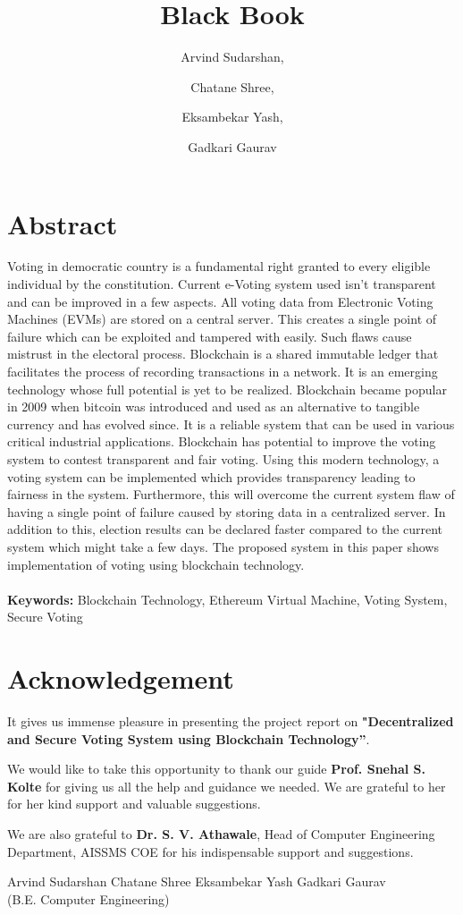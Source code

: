 \documentclass[a4paper, oneside, 12pt]{book}
\title{Black Book}
\author{
  Arvind Sudarshan,
  \and
  Chatane Shree,
  \and
  Eksambekar Yash,
  \and
  Gadkari Gaurav
}
\begin{document}
	\pagestyle{plain}
	\renewcommand{\headrulewidth}{0pt}
	\titleformat{\chapter}[display]{\bfseries\centering}{\chaptertitlename}{20pt}{\Large\uppercase}

	\frontmatter
	\chapter*{Abstract}
		Voting in democratic country is a fundamental right granted to every eligible individual by the constitution. Current e-Voting system used isn’t transparent and can be improved in a few aspects. All voting data from Electronic Voting Machines (EVMs) are stored on a central server. This creates a single point of failure which can be exploited and tampered with easily. Such flaws cause mistrust in the electoral process. Blockchain is a shared  immutable ledger that facilitates the process of recording transactions in a network. It is an emerging technology whose full potential is yet to be realized. Blockchain became popular in 2009 when bitcoin was introduced and used as an alternative to tangible currency and has evolved since. It is a reliable system that can be used in various critical industrial applications. Blockchain has potential to improve the voting system to contest transparent and fair voting. Using this modern technology, a voting system can be implemented which provides transparency leading to fairness in the system. Furthermore, this will overcome the current system flaw of having a single point of failure caused by storing data in a centralized server. In addition to this, election results can be declared faster compared to the current system which might take a few days. The proposed system in this paper shows implementation of voting using blockchain technology.\\\\
		\textbf{Keywords:} Blockchain Technology, Ethereum Virtual Machine, Voting System, Secure Voting
	\chapter*{Acknowledgement}
		It gives us immense pleasure in presenting the project report on \textbf{"Decentralized and Secure Voting System using Blockchain Technology”}.\par
		We would like to take this opportunity to thank our guide \textbf{Prof. Snehal S. Kolte} for giving us all the help and guidance we needed. We are grateful to her for her kind support and valuable suggestions.\par
		We are also grateful to \textbf{Dr. S. V. Athawale}, Head of Computer Engineering Department, AISSMS COE for his indispensable support and suggestions.\break\break\break\break\break\break\break\break
		\begin{flushright}
		Arvind Sudarshan\break\break
		Chatane Shree\break\break
		Eksambekar Yash\break\break
		Gadkari Gaurav\\
		(B.E. Computer Engineering)		
		\end{flushright}
	\tableofcontents
	\listoffigures
	\listoftables
	
\end{document}
